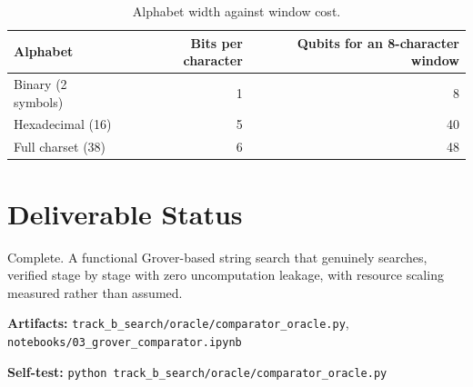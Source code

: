 \documentclass[11pt,a4paper]{article}
\begin{document}
\begin{table}[h]
\centering
\caption{Alphabet width against window cost.}
\begin{tabular}{@{}lrr@{}}
\toprule
Alphabet & Bits per character & Qubits for an 8-character window \\
\midrule
Binary (2 symbols) & 1 & 8 \\
Hexadecimal (16) & 5 & 40 \\
Full charset (38) & 6 & 48 \\
\bottomrule
\end{tabular}
\end{table}

\section{Deliverable Status}

Complete. A functional Grover-based string search that genuinely searches,
verified stage by stage with zero uncomputation leakage, with resource scaling
measured rather than assumed.

\vspace{0.3cm}
\noindent\textbf{Artifacts:} \texttt{track\_b\_search/oracle/comparator\_oracle.py},
\texttt{notebooks/03\_grover\_comparator.ipynb}

\vspace{0.2cm}
\noindent\textbf{Self-test:} \texttt{python track\_b\_search/oracle/comparator\_oracle.py}
\end{document}
